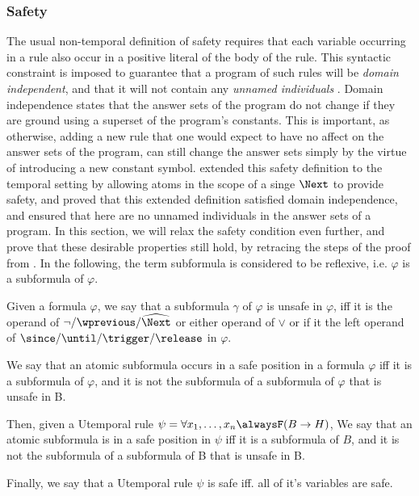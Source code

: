 \subsubsection{Safety}

The usual non-temporal definition of safety requires that each
variable occurring in a rule also occur in a positive literal of the
body of the rule. This syntactic constraint is imposed to guarantee
that a program of such rules will be \emph{domain independent}, and
that it will not contain any \emph{unnamed individuals}
\cite{capeva09b}. Domain independence states that the answer sets of
the program do not change if they are ground using a superset of the
program's constants. This is important, as otherwise, adding a new
rule that one would expect to have no affect on the answer sets of the
program, can still change the answer sets simply by the virtue of
introducing a new constant symbol. \cite{agcapevidi17a} extended this
safety definition to the temporal setting by allowing atoms in the
scope of a singe $\Next$ to provide safety, and proved that this
extended definition satisfied domain independence, and ensured that
here are no unnamed individuals in the answer sets of a program. In
this section, we will relax the safety condition even further, and
prove that these desirable properties still hold, by retracing the
steps of the proof from \cite{agcapevidi17a}. In the following, the
term subformula is considered to be reflexive, i.e. $\varphi$ is a
subformula of $\varphi$.

\begin{definition}[Safety]
  Given a formula $\varphi$, we say that a subformula $\gamma$ of
  $\varphi$ is unsafe in $\varphi$, iff it is the operand of
  $\neg/\wprevious/\wnext$ or either operand of $\vee$ or if it the
  left operand of $\since/\until/\trigger/\release$ in $\varphi$.

  We say that an atomic subformula occurs in a safe position in a formula
  $\varphi$ iff it is a subformula of $\varphi$, and it is not the
  subformula of a subformula of $\varphi$ that is unsafe in B.

  Then, given a Utemporal rule
  $\psi=\forall x_1, \dots, x_n \alwaysF(B \rightarrow H)$, We say
  that an atomic subformula is in a safe position in $\psi$ iff it is
  a subformula of $B$, and it is not the subformula of a subformula of
  B that is unsafe in B.

  Finally, we say that a Utemporal rule $\psi$ is safe iff. all of it's variables are safe.
\end{definition}

